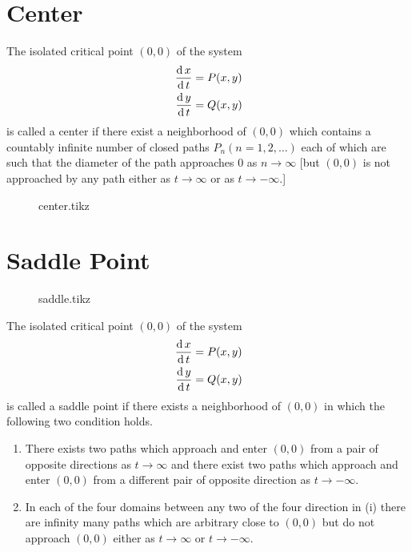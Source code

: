 \documentclass[../main-sheet.tex]{subfiles}
\begin{document}
\section{Center}
The isolated critical point \((0,0)\) of the system 
\begin{align*}
    \,\frac{\mathrm{d}\,x}{\mathrm{d}\,t}&=P(x,y)\\
    \,\frac{\mathrm{d}\,y}{\mathrm{d}\,t}&=Q(x,y)
\end{align*}
is called a center if there exist a neighborhood of \((0,0)\) which contains a countably infinite number of closed paths \(P_n(n=1,2,\dots)\) each of which are such that the diameter of the path approaches \(0\) as \(n\to \infty\) [but \((0,0)\) is not approached by any path either as \(t\to \infty\) or as \(t\to -\infty\).]
\begin{figure}[H]
    \centering
    {center.tikz}
\end{figure}

\section{Saddle Point}
\begin{figure}[H]
    \centering
    {saddle.tikz}
\end{figure}
The isolated critical point \((0,0)\) of the system
\begin{align*}
    \,\frac{\mathrm{d}\,x}{\mathrm{d}\,t}&=P(x,y)\\
    \,\frac{\mathrm{d}\,y}{\mathrm{d}\,t}&=Q(x,y)
\end{align*}
is called a saddle point if there exists a neighborhood of \((0,0)\) in which the following two condition holds.
\begin{enumerate}[label=(\roman*)]
    \item There exists two paths which approach and enter \((0,0)\) from a pair of opposite directions as \(t\to \infty\) and there exist two paths which approach and enter \((0,0)\) from a different pair of opposite direction as \(t\to -\infty\).
    \item In each of the four domains between any two of the four direction in (i) there are infinity many paths which are arbitrary close to \((0,0)\) but do not approach \((0,0)\) either as \(t\to \infty\) or \(t\to-\infty\).
\end{enumerate}
\end{document}
